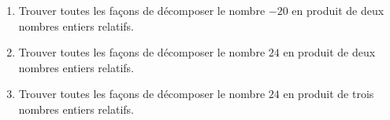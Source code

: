 
\begin{exercice}\label{exosmath-0750}

    \begin{enumerate}
        \item
Trouver toutes les façons de décomposer le nombre $-20$ en produit de deux nombres entiers relatifs.
\item
Trouver toutes les façons de décomposer le nombre $24$ en produit de deux nombres entiers relatifs.
\item
Trouver toutes les façons de décomposer le nombre $24$ en produit de trois nombres entiers relatifs.
    \end{enumerate}

\end{exercice}
